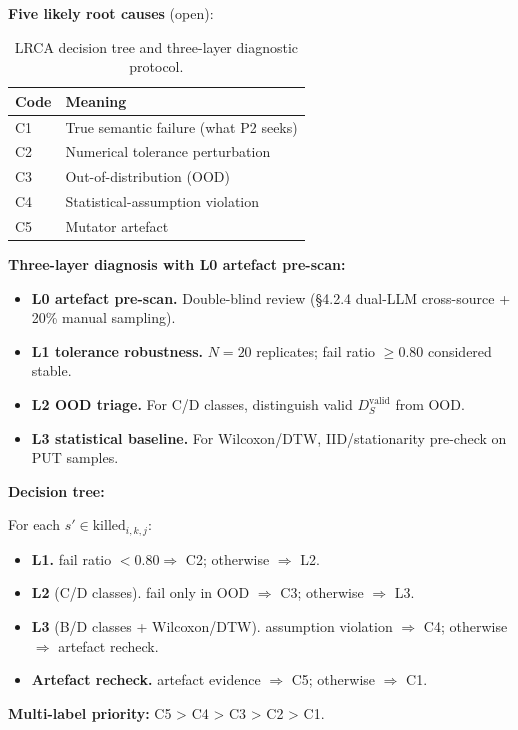 \documentclass[review,12pt,authoryear]{elsarticle}
\begin{document}
\textbf{Five likely root causes} (open):

{\def\LTcaptype{table} %
\begin{longtable}[]{@{}ll@{}}
\caption{LRCA decision tree and three-layer diagnostic protocol.}\label{tab:p2-15}\\
\toprule\noalign{}
Code & Meaning \\
\midrule\noalign{}
\endhead
\bottomrule\noalign{}
\endlastfoot
C1 & True semantic failure (what P2 seeks) \\
C2 & Numerical tolerance perturbation \\
C3 & Out-of-distribution (OOD) \\
C4 & Statistical-assumption violation \\
C5 & Mutator artefact \\
\end{longtable}
}

\textbf{Three-layer diagnosis with L0 artefact pre-scan:}

\begin{itemize}
\item \textbf{L0 artefact pre-scan.} Double-blind review (§4.2.4 dual-LLM cross-source + 20\% manual sampling).
\item \textbf{L1 tolerance robustness.} $N = 20$ replicates; fail ratio $\geq 0.80$ considered stable.
\item \textbf{L2 OOD triage.} For C/D classes, distinguish valid $D_S^{\text{valid}}$ from OOD.
\item \textbf{L3 statistical baseline.} For Wilcoxon/DTW, IID/stationarity pre-check on PUT samples.
\end{itemize}

\textbf{Decision tree:}

For each $s' \in \mathrm{killed}_{i,k,j}$:
\begin{itemize}
\item \textbf{L1.} fail ratio $< 0.80 \Rightarrow$ C2; otherwise $\Rightarrow$ L2.
\item \textbf{L2} (C/D classes). fail only in OOD $\Rightarrow$ C3; otherwise $\Rightarrow$ L3.
\item \textbf{L3} (B/D classes + Wilcoxon/DTW). assumption violation $\Rightarrow$ C4; otherwise $\Rightarrow$ artefact recheck.
\item \textbf{Artefact recheck.} artefact evidence $\Rightarrow$ C5; otherwise $\Rightarrow$ C1.
\end{itemize}

\textbf{Multi-label priority:} C5 \textgreater{} C4 \textgreater{} C3
\textgreater{} C2 \textgreater{} C1.
\end{document}
